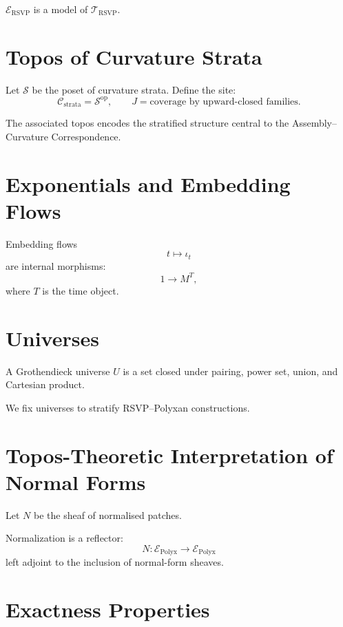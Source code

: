 \begin{proposition}
$\mathscr{E}_{\mathrm{RSVP}}$ is a model of $\mathcal{T}_{\mathrm{RSVP}}$.
\end{proposition}

\section{Topos of Curvature Strata}

Let $\mathcal{S}$ be the poset of curvature strata.  
Define the site:
\[
\mathcal{C}_{\mathrm{strata}} = \mathcal{S}^{\mathrm{op}},
\qquad
J = \text{coverage by upward-closed families}.
\]

The associated topos encodes the stratified structure central to the Assembly–Curvature Correspondence.

\section{Exponentials and Embedding Flows}

Embedding flows
\[
t \mapsto \iota_t
\]
are internal morphisms:
\[
1 \to M^T,
\]
where $T$ is the time object.

\section{Universes}

\begin{definition}
A Grothendieck universe $U$ is a set closed under pairing, power set, union, and Cartesian product.
\end{definition}

We fix universes to stratify RSVP–Polyxan constructions.

\section{Topos-Theoretic Interpretation of Normal Forms}

Let $N$ be the sheaf of normalised patches.

\begin{proposition}
Normalization is a reflector:
\[
N : \mathscr{E}_{\mathrm{Polyx}} \to \mathscr{E}_{\mathrm{Polyx}}
\]
left adjoint to the inclusion of normal-form sheaves.
\end{proposition}

\section{Exactness Properties}

